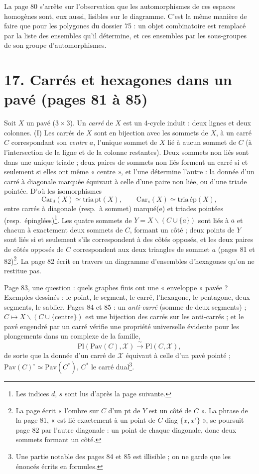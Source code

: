 \documentclass[11pt,a4paper]{article}
\begin{document}
La page 80 s'arrête sur l'observation que les automorphismes de ces espaces
homogènes sont, eux aussi, lisibles sur le diagramme. C'est la
même manière de faire que pour les polygones du dossier 75 : un objet
combinatoire est remplacé par la liste des ensembles qu'il détermine, et ces
ensembles par les sous-groupes de son groupe d'automorphismes.

\section*{17. Carrés et hexagones dans un pavé (pages 81 à 85)}

Soit $X$ un pavé ($3 \times 3$). Un \emph{carré} de $X$ est un 4-cycle induit :
deux lignes et deux colonnes. (I) Les carrés de $X$ sont en bijection avec les
sommets de $X$, à un carré $C$ correspondant son \emph{centre} $a$, l'unique
sommet de $X$ lié à aucun sommet de $C$ (à l'intersection de la ligne et de la
colonne restantes). Deux sommets non liés sont dans une unique triade ; deux
paires de sommets non liés forment un carré si et seulement si elles ont même
« centre », et l'une détermine l'autre : la donnée d'un carré à diagonale
marquée équivaut à celle d'une paire non liée, ou d'une triade pointée. D'où
les isomorphismes
\[
\mathrm{Car}_d(X) \simeq \mathrm{tria\,pt}(X), \qquad \mathrm{Car}_s(X) \simeq
\mathrm{tria\,ép}(X),
\]
entre carrés à diagonale (resp.\ à sommet) marqué(e) et triades pointées (resp.\
épinglées)\footnote{Les indices $d$, $s$ sont lus d'après la page suivante.}.
Les quatre sommets de $Y = X \smallsetminus (C \cup \lbrace a\rbrace)$ sont liés
à $a$ et chacun à exactement deux sommets de $C$, formant un côté ; deux points
de $Y$ sont liés si et seulement s'ils correspondent à des côtés opposés, et
les deux paires de côtés opposés de $C$ correspondent aux deux triangles de
sommet $a$ (pages 81 et 82)\footnote{La page écrit « l'ombre sur $C$ d'un pt de
$Y$ est un côté de $C$ ». La phrase de la page 81, « est lié exactement à un
point de $C$ diag $\lbrace x, x'\rbrace$ », se poursuit page 82 par l'autre
diagonale : un point de chaque diagonale, donc deux sommets formant un côté.}. La page 82
écrit en travers un diagramme d'ensembles d'hexagones qu'on ne restitue pas.

Page 83, une question : quels graphes finis ont une « enveloppe » pavée ?
Exemples dessinés : le point, le segment, le carré, l'hexagone, le pentagone,
deux segments, le sablier. Pages 84 et 85 : un \emph{anti-carré} (somme de deux
segments) ; $C \mapsto X \smallsetminus (C \cup \lbrace \text{centre}\rbrace)$ est une
bijection des carrés sur les anti-carrés ; et le pavé engendré par un carré
vérifie une propriété universelle évidente pour les plongements dans un complexe
de la famille,
\[
\mathrm{Pl}(\mathrm{Pav}(C), \mathcal{X}) \xrightarrow{\ \sim\ }
\mathrm{Pl}(C, \mathcal{X}),
\]
de sorte que la donnée d'un carré de $\mathcal{X}$ équivaut à celle d'un pavé
pointé ; $\mathrm{Pav}(C)^\circ \simeq \mathrm{Pav}(C^*)$, $C^*$ le carré
dual\footnote{Une partie notable des pages 84 et 85 est illisible ; on ne
garde que les énoncés écrits en formules.}.
\end{document}
